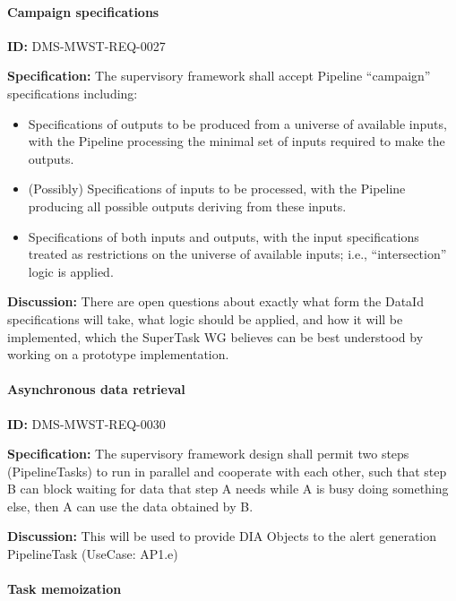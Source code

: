 \documentclass[SE,toc,lsstdraft]{lsstdoc}
\begin{document}
\paragraph{Campaign specifications}\hfill  %

\label{DMS-MWST-REQ-0027}
\textbf{ID:} DMS-MWST-REQ-0027

\textbf{Specification:}
The supervisory framework shall accept Pipeline “campaign” specifications including:

    \begin{itemize}
\item
Specifications of outputs to be produced from a universe of available inputs, with the Pipeline processing the minimal set of inputs required to make the outputs.

\item
(Possibly) Specifications of inputs to be processed, with the Pipeline producing all possible outputs deriving from these inputs.

\item
Specifications of both inputs and outputs, with the input specifications treated as restrictions on the universe of available inputs; i.e., “intersection” logic is applied.

    \end{itemize}

\textbf{Discussion:}
There are open questions about exactly what form the DataId specifications will take, what logic should be applied, and how it will be implemented, which the SuperTask WG believes can be best understood by working on a prototype implementation.

\paragraph{Asynchronous data retrieval}\hfill  %

\label{DMS-MWST-REQ-0030}
\textbf{ID:} DMS-MWST-REQ-0030

\textbf{Specification:}
The supervisory framework design shall permit two steps (PipelineTasks) to run in parallel and cooperate with each other, such that step B can block waiting for data that step A needs while A is busy doing something else, then A can use the data obtained by B.

\textbf{Discussion:}
This will be used to provide DIA Objects to the alert generation PipelineTask (UseCase: AP1.e)

\paragraph{Task memoization}\hfill  %
\end{document}
